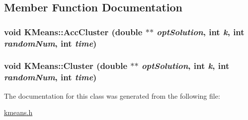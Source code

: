 \subsection{Member Function Documentation}
\hypertarget{classKMeans_e6d90d4b1137147b086e22e2a14898fd}{
\subsubsection[{AccCluster}]{\setlength{\rightskip}{0pt plus 5cm}void KMeans::AccCluster (double $\ast$$\ast$ {\em optSolution}, \/  int {\em k}, \/  int {\em randomNum}, \/  int {\em time})}}
\label{classKMeans_e6d90d4b1137147b086e22e2a14898fd}


\hypertarget{classKMeans_7bbee987d930a8619d4252a8684e49f8}{
\subsubsection[{Cluster}]{\setlength{\rightskip}{0pt plus 5cm}void KMeans::Cluster (double $\ast$$\ast$ {\em optSolution}, \/  int {\em k}, \/  int {\em randomNum}, \/  int {\em time})}}
\label{classKMeans_7bbee987d930a8619d4252a8684e49f8}




The documentation for this class was generated from the following file:\begin{CompactItemize}
\item 
\hyperlink{kmeans_8h}{kmeans.h}\end{CompactItemize}

